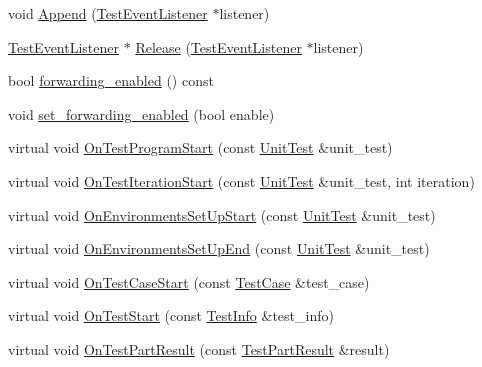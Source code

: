 \begin{DoxyCompactItemize}
\item 
void \hyperlink{classtesting_1_1internal_1_1TestEventRepeater_ad98bf37c3296d62b69659734cb6c7cf8}{\-Append} (\hyperlink{classtesting_1_1TestEventListener}{\-Test\-Event\-Listener} $\ast$listener)
\item 
\hyperlink{classtesting_1_1TestEventListener}{\-Test\-Event\-Listener} $\ast$ \hyperlink{classtesting_1_1internal_1_1TestEventRepeater_aa2026c03637b3e7dbde6011e39ef7527}{\-Release} (\hyperlink{classtesting_1_1TestEventListener}{\-Test\-Event\-Listener} $\ast$listener)
\item 
bool \hyperlink{classtesting_1_1internal_1_1TestEventRepeater_a52998d5b896a7fdc74e14f713df0a2cb}{forwarding\-\_\-enabled} () const 
\item 
void \hyperlink{classtesting_1_1internal_1_1TestEventRepeater_a98d02212569aa17d23c98a0c4b742d08}{set\-\_\-forwarding\-\_\-enabled} (bool enable)
\item 
virtual void \hyperlink{classtesting_1_1internal_1_1TestEventRepeater_a99623b41fa569a273446aafb98cc43b0}{\-On\-Test\-Program\-Start} (const \hyperlink{classtesting_1_1UnitTest}{\-Unit\-Test} \&unit\-\_\-test)
\item 
virtual void \hyperlink{classtesting_1_1internal_1_1TestEventRepeater_aea5c56c29cc19b7d811a02ea93f0c440}{\-On\-Test\-Iteration\-Start} (const \hyperlink{classtesting_1_1UnitTest}{\-Unit\-Test} \&unit\-\_\-test, int iteration)
\item 
virtual void \hyperlink{classtesting_1_1internal_1_1TestEventRepeater_a54e314e87dd4f40cf054af17214fe5d8}{\-On\-Environments\-Set\-Up\-Start} (const \hyperlink{classtesting_1_1UnitTest}{\-Unit\-Test} \&unit\-\_\-test)
\item 
virtual void \hyperlink{classtesting_1_1internal_1_1TestEventRepeater_a4ff3e9c1eca9b8c7d17c39c260283985}{\-On\-Environments\-Set\-Up\-End} (const \hyperlink{classtesting_1_1UnitTest}{\-Unit\-Test} \&unit\-\_\-test)
\item 
virtual void \hyperlink{classtesting_1_1internal_1_1TestEventRepeater_adeff7f41a379b240b282fe511ff8bcbf}{\-On\-Test\-Case\-Start} (const \hyperlink{classtesting_1_1TestCase}{\-Test\-Case} \&test\-\_\-case)
\item 
virtual void \hyperlink{classtesting_1_1internal_1_1TestEventRepeater_ae19a0ede8525bdc3ec6e05725004769b}{\-On\-Test\-Start} (const \hyperlink{classtesting_1_1TestInfo}{\-Test\-Info} \&test\-\_\-info)
\item 
virtual void \hyperlink{classtesting_1_1internal_1_1TestEventRepeater_a2999e3c9131fe27efd468fb4c20aef3a}{\-On\-Test\-Part\-Result} (const \hyperlink{classtesting_1_1TestPartResult}{\-Test\-Part\-Result} \&result)

\end{DoxyCompactItemize}
